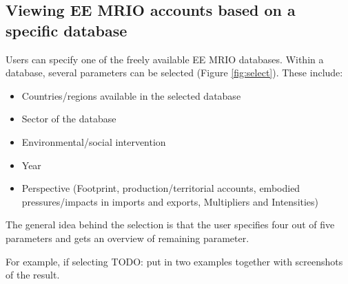\subsection{Viewing EE MRIO accounts based on a specific database}

Users can specify one of the freely available EE MRIO databases. 
Within a database, several parameters can be selected (Figure \ref{fig:select}). These include:

\begin{itemize}
    \item Countries/regions available in the selected database
    \item Sector of the database
    \item Environmental/social intervention
    \item Year
    \item Perspective (Footprint, production/territorial accounts, embodied
      pressures/impacts in imports and exports, Multipliers and Intensities)
\end{itemize}


The general idea behind the selection is that the user specifies four out
of five parameters and gets an overview of remaining parameter.

For example, if selecting TODO: put in two examples together with
screenshots of the result.